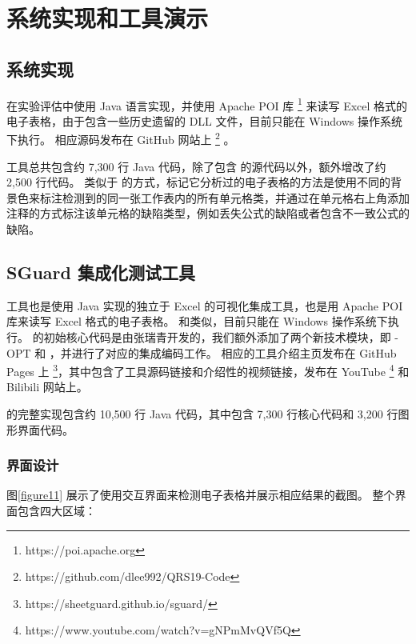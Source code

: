 \chapter{系统实现和工具演示}

\section{\wa 系统实现}

\wa 在实验评估中使用 Java 语言实现，并使用 Apache POI 库 \footnote{https://poi.apache.org} 来读写 Excel 格式的电子表格，由于包含一些历史遗留的 DLL 文件，目前只能在 Windows 操作系统下执行。
相应源码发布在 GitHub 网站上 \footnote{https://github.com/dlee992/QRS19-Code} 。

\wa 工具总共包含约 7,300 行 Java 代码，除了包含 \cu 的源代码以外，额外增改了约 2,500 行代码。
类似于 \cu 的方式，\wa 标记它分析过的电子表格的方法是使用不同的背景色来标注检测到的同一张工作表内的所有单元格类，并通过在单元格右上角添加注释的方式标注该单元格的缺陷类型，例如丢失公式的缺陷或者包含不一致公式的缺陷。

\section{SGuard 集成化测试工具}

\sg 工具也是使用 Java 实现的独立于 Excel 的可视化集成工具，也是用 Apache POI 库来读写 Excel 格式的电子表格。
和\wa 类似，目前只能在 Windows 操作系统下执行。
\sg 的初始核心代码是由张瑞青开发的，我们额外添加了两个新技术模块，即 \cu-OPT 和 \wa ，并进行了对应的集成编码工作\cite{li2019sguard}。
相应的工具介绍主页发布在 GitHub Pages 上 \footnote{https://sheetguard.github.io/sguard/}，其中包含了工具源码链接和介绍性的视频链接，发布在 YouTube \footnote{https://www.youtube.com/watch?v=gNPmMvQVf5Q} 和 Bilibili 网站上。

\sg 的完整实现包含约 10,500 行 Java 代码，其中包含 7,300 行核心代码和 3,200 行图形界面代码。

\subsection{界面设计}



图\ref{figure11} 展示了\sg 使用交互界面来检测电子表格并展示相应结果的截图。
整个界面包含四大区域：

